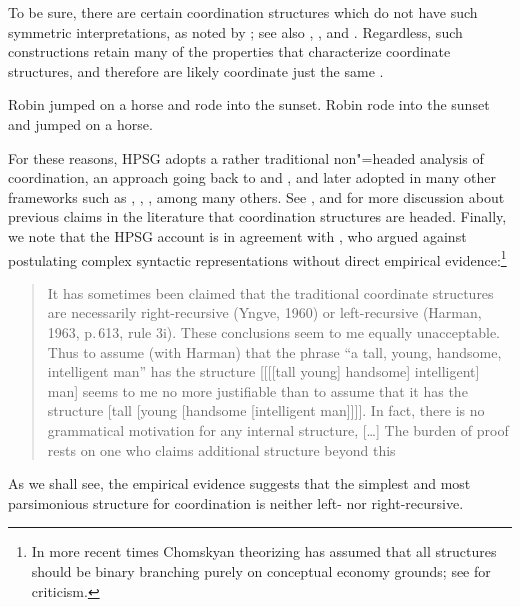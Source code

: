 \documentclass[output=paper
                ,modfonts
                ,nonflat
	        ,collection
	        ,collectionchapter
	        ,collectiontoclongg
 	        ,biblatex
                ,babelshorthands
                ,newtxmath
                ,draftmode
                ,colorlinks, citecolor=brown
]{./langsci/langscibook}
\begin{document}
\noindent
To be sure, there are certain coordination structures which do not have such symmetric 
interpretations, as noted by \citet{ross67}; see also
\citet{goldsmith}, \citet{lakoff86}, and \citet{levinprince86}.
Regardless, such constructions retain many of the properties that characterize coordinate structures, and therefore are likely 
coordinate just the same \citep[Chapter 5]{kehler}.

\begin{exe}
\ex
\begin{xlista}
\ex Robin jumped on a horse and rode into the sunset.
\ex Robin rode into the sunset and jumped on a horse.
\end{xlista}
\end{exe}

For these reasons, HPSG adopts a rather traditional non"=headed analysis of coordination, an approach  going back
to \citet[195]{bloom} and  \citet{ross67}, and later adopted in many other frameworks such as \citet{pesetsky}, \citet{gazdarc},  \citet[1275]{rodney}, among many others. 
See \citet{borsley94}, \citet{Borsley:05} and 
\citet[Chaves 2]{chavesthesis} for more discussion about previous claims in the literature that coordination structures are headed.
Finally, we note that the HPSG account is in agreement with \citet[196]{chom65}, who argued against postulating complex syntactic representations without direct empirical evidence:\footnote{In more recent times Chomskyan theorizing has assumed that all structures should be binary branching purely on conceptual economy grounds; see \citet{Johnson:Lappin:99} for criticism.}

\begin{quote}
It has sometimes been claimed that the traditional coordinate structures are necessarily right-recursive (Yngve, 1960) or left-recursive (Harman, 1963, p.\,613, rule 3i). These conclusions seem to me equally unacceptable. Thus to assume (with Harman) that the phrase “a tall, young, handsome, intelligent man” has the structure [[[[tall young] handsome] intelligent] man] seems to me no more justifiable than to assume that it has
the structure [tall [young [handsome [intelligent man]]]]. In fact, there is no grammatical
motivation for any internal structure, [\ldots] The burden of proof rests on one who claims additional
structure beyond this \citep[196--197]{chom65}
\end{quote}

\noindent
As we shall see, the empirical evidence suggests that
the simplest and most parsimonious structure for coordination is neither left- nor right-recursive.
\end{document}
